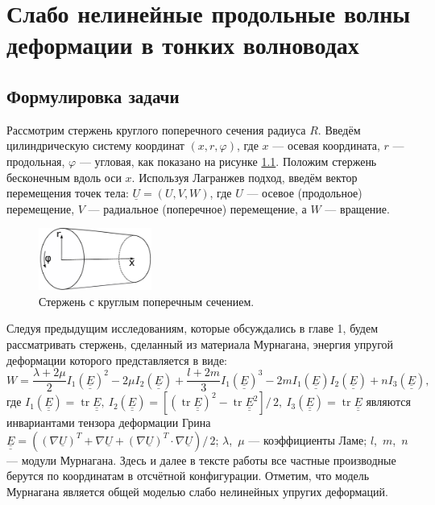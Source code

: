 \documentclass[12pt, a4paper]{report}
\DeclareMathOperator{\trace}{tr}
\newcommand{\lb}{\left (}
\newcommand{\rb}{\right )}
\newcommand{\lsq}{\left [}
\newcommand{\rsq}{\right ]}
\newcommand{\vect}[1]{\underline{#1}}
\newcommand{\tens}[1]{\underline{\underline{#1}}}
\begin{document}
\chapter{Слабо нелинейные продольные волны деформации в тонких волноводах}

\section{Формулировка задачи}


Рассмотрим стержень круглого поперечного сечения радиуса $R$. Введём цилиндрическую систему координат $(x, r, \varphi)$, где $x$ --- осевая координата, $r$ --- продольная, $\varphi$ --- угловая, как показано на рисунке \ref{fig:rod}. Положим стержень бесконечным вдоль оси $x$. Используя Лагранжев подход, введём вектор перемещения точек тела: $\vect{U} = (U, V, W)$, где $U$ --- осевое (продольное) перемещение, $V$ --- радиальное (поперечное) перемещение, а $W$ --- вращение.
\begin{figure}[h]
	\centering
	\includegraphics[width=0.33\textwidth]{1_RodSchematic}
	\caption{Стержень с круглым поперечным сечением.}
	\label{fig:rod}
\end{figure}

Следуя предыдущим исследованиям, которые обсуждались в главе 1, будем рассматривать стержень, сделанный из материала Мурнагана, энергия упругой деформации которого представляется в виде:
\begin{equation}\label{2_murnaghan_pot}
W = \frac{\lambda + 2\mu}{2}I_1(\tens{E})^2 - 2\mu I_2(\tens{E}) + \frac{l+2m}{3}I_1(\tens{E})^3 - 2m I_1(\tens{E}) I_2(\tens{E}) + n I_3(\tens{E}),
\end{equation}
где $I_1(\tens{E}) = \trace \tens{E},\  I_2(\tens{E}) = \lsq(\trace \tens{E})^2 - \trace \tens{E}^2\rsq/\,2,\ I_3(\tens{E}) = \trace \tens{E}$ являются инвариантами тензора деформации Грина
$\tens{E} = \lb (\nabla\vect{U})^T + \nabla\vect{U} + (\nabla\vect{U})^T\cdot\nabla\vect{U} \rb / \, 2$; 
$\lambda$,~$\mu$ --- коэффициенты Ламе; $l$,~$m$,~$n$ --- модули Мурнагана. Здесь и далее в тексте работы все частные производные берутся по координатам в отсчётной конфигурации. Отметим, что модель Мурнагана является общей моделью слабо нелинейных упругих деформаций.
\end{document}
